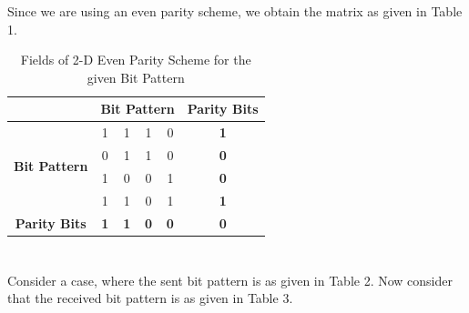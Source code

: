 \documentclass[12pt]{article}
\begin{document}
Since we are using an even parity scheme, we obtain the matrix as given in Table 1.

\begin{table}[]
\begin{center}
\begin{tabular}{|c|c|c|c|c|c|}
\hline
\multicolumn{1}{|l|}{}                & \multicolumn{4}{c|}{\textbf{Bit Pattern}}         & \textbf{Parity Bits} \\ \hline
\multirow{4}{*}{\textbf{Bit Pattern}} & 1          & 1          & 1          & 0          & \textbf{1}           \\ \cline{2-6} 
                                      & 0          & 1          & 1          & 0          & \textbf{0}           \\ \cline{2-6} 
                                      & 1          & 0          & 0          & 1          & \textbf{0}           \\ \cline{2-6} 
                                      & 1          & 1          & 0          & 1          & \textbf{1}           \\ \hline
\textbf{Parity Bits}                  & \textbf{1} & \textbf{1} & \textbf{0} & \textbf{0} & \textbf{0}           \\ \hline
\end{tabular}
\caption{Fields of 2-D Even Parity Scheme for the given Bit Pattern}
\end{center}
\end{table}


\section{}

Consider a case, where the sent bit pattern is as given in Table 2. Now consider that the received bit pattern is as given in Table 3.
\end{document}
